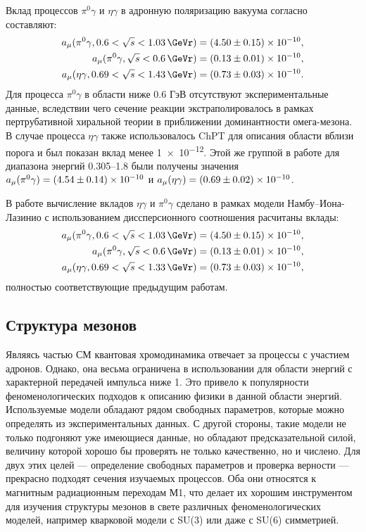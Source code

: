 Вклад процессов $\pi^0\gamma$ и $\eta\gamma$ в адронную поляризацию вакуума согласно \cite{Hagiwara:2003da} составляют:
\begin{align}
    a_\mu ( \pi^0 \gamma, 0.6 < \sqrt{s} < \SI{1.03}{\GeVr} ) =
    \num{4.50+-0.15e-10} , \\
    a_\mu ( \pi^0 \gamma, \sqrt{s} < \SI{0.6}{\GeVr} ) =
    \num{0.13+-0.01e-10} , \\
    a_\mu ( \eta \gamma, 0.69 < \sqrt{s} < \SI{1.43}{\GeVr} ) =
    \num{0.73+-0.03e-10} .
\end{align}
Для процесса $\pi^0 \gamma$ в области ниже 0.6 ГэВ отсутствуют экспериментальные данные, вследствии чего сечение реакции экстраполировалось в рамках пертрубативной хиральной теории в приближении доминантности омега-мезона.
В случае процесса $\eta \gamma$ также использовалось ChPT для описания области вблизи порога и был показан вклад менее \num{1e-12}.
Этой же группой в работе \cite{Hagiwara:2011af} для диапазона энергий \SIrange{0.305}{1.8}{\GeVr} были получены значения $a_\mu(\pi^0\gamma) = \num{4.54+-.14e-10}$ и $a_\mu(\eta\gamma) = \num{0.69+-.02e-10}$.

В работе \cite{Ahmadov:2010hq} вычисление вкладов $\eta \gamma$ и $\pi^0 \gamma$ сделано в рамках модели Намбу--Иона-Лазинио с использованием диссперсионного соотношения расчитаны вклады:
\begin{align}
    a_\mu ( \pi^0 \gamma, 0.6 < \sqrt{s} < \SI{1.03}{\GeVr} ) =
    \num{4.5+-0.15e-10} , \\
    a_\mu ( \pi^0 \gamma, \sqrt{s} < \SI{0.6}{\GeVr} ) =
    \num{0.13+-0.01e-10} , \\
    a_\mu ( \eta \gamma, 0.69 < \sqrt{s} < \SI{1.33}{\GeVr} ) =
    \num{0.73+-0.03e-10} ,
\end{align}
полностью соответствующие предыдущим работам.


\subsection{Структура мезонов}
\label{meson-structures}

Являясь частью СМ квантовая хромодинамика отвечает за процессы с участием адронов. Однако, она весьма ограничена в использовании для области энергий с характерной передачей импульса ниже \SI{1}{\GeVr}.
Это привело к популярности феноменологических подходов к описанию физики в данной области энергий.
Используемые модели обладают рядом свободных параметров,
которые можно определять из экспериментальных данных. С другой стороны,
такие модели не только подгоняют уже имеющиеся данные, но обладают
предсказательной силой, величину которой хорошо бы проверять не только качественно, но и числено. Для двух
этих целей --- определение свободных параметров и проверка верности ---
прекрасно подходят сечения изучаемых процессов.
Оба они относятся к магнитным радиационным переходам М1,
что делает их хорошим инструментом для изучения структуры мезонов в
свете различных феноменологических моделей, например кварковой модели с
SU(3) или даже с SU(6) симметрией.

